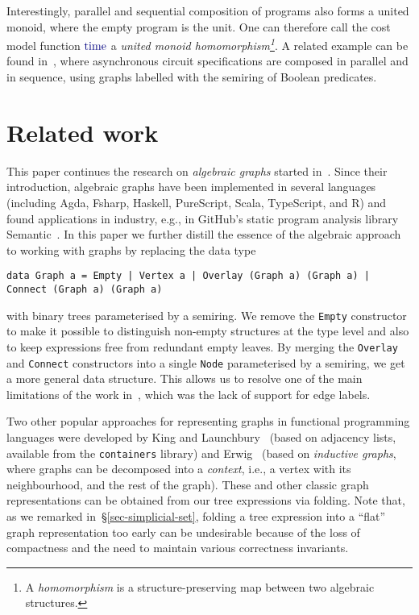 \documentclass[english,submission]{programming}
\newcommand{\code}[1]{\lstinline[mathescape]|#1|}
\newcommand{\hcode}[1]{{\color{darkblue} \lstinline[keywordstyle={}]|#1|}} %
\begin{document}
\noindent
Interestingly, parallel and sequential composition of programs also forms a
united monoid, where the empty program is the unit. One can therefore call the
cost model function $\text{\hcode{time}}$ a \emph{united monoid
homomorphism\footnote{
    A \emph{homomorphism} is a structure-preserving map between two algebraic
    structures.
}}. A related example can be found in~\cite{beaumont2017concepts}, where
asynchronous circuit specifications are composed in parallel and in sequence,
using graphs labelled with the semiring of Boolean predicates.


\section{Related work}\label{sec-related-work}

This paper continues the research on \emph{algebraic graphs} started
in~\cite{mokhov_alga}. Since their introduction, algebraic graphs have been
implemented in several languages (including Agda, Fsharp, Haskell, PureScript,
Scala, TypeScript, and R) and found applications in industry, e.g., in GitHub's
static program analysis library Semantic~\cite{semantic_paper}\cite{semantic_repo}.
In this paper we further distill the essence of the algebraic approach to
working with graphs by replacing the data type

\begin{lstlisting}[basicstyle=\sffamily\smaller]
data Graph a = Empty | Vertex a | Overlay (Graph a) (Graph a) | Connect (Graph a) (Graph a)
\end{lstlisting}

\noindent
with binary trees parameterised by a semiring. We remove the \hcode{Empty}
constructor to make it possible to distinguish non-empty structures at the
type level and also to keep expressions free from redundant empty leaves. By
merging the \hcode{Overlay} and \hcode{Connect} constructors into a single
\hcode{Node} parameterised by a semiring, we get a more general data structure.
This allows us to resolve one of the main limitations of the work
in~\cite{mokhov_alga}, which was the lack of support for edge labels.

Two other popular approaches for representing graphs in functional programming
languages were developed by King and Launchbury~\cite{1995_king_graphs}
(based on adjacency lists, available from the \code{containers} library)
and Erwig~\cite{2001_erwig_inductive} (based on \emph{inductive graphs}, where
graphs can be decomposed into a \emph{context}, i.e., a vertex with its
neighbourhood, and the rest of the graph). These and other classic graph
representations can be obtained from our tree expressions via folding. Note
that, as we remarked in~\S\ref{sec-simplicial-set}, folding a tree expression
into a ``flat'' graph representation too early can be undesirable because of the
loss of compactness and the need to maintain various correctness invariants.
\end{document}
